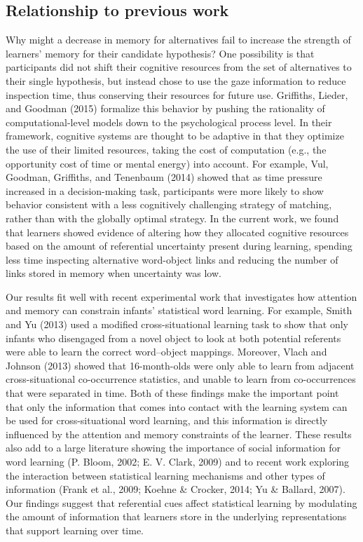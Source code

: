 \documentclass[oneside]{report}
\begin{document}
\subsection{Relationship to previous
work}\label{relationship-to-previous-work}

Why might a decrease in memory for alternatives fail to increase the
strength of learners' memory for their candidate hypothesis? One
possibility is that participants did not shift their cognitive resources
from the set of alternatives to their single hypothesis, but instead
chose to use the gaze information to reduce inspection time, thus
conserving their resources for future use. Griffiths, Lieder, and
Goodman (2015) formalize this behavior by pushing the rationality of
computational-level models down to the psychological process level. In
their framework, cognitive systems are thought to be adaptive in that
they optimize the use of their limited resources, taking the cost of
computation (e.g., the opportunity cost of time or mental energy) into
account. For example, Vul, Goodman, Griffiths, and Tenenbaum (2014)
showed that as time pressure increased in a decision-making task,
participants were more likely to show behavior consistent with a less
cognitively challenging strategy of matching, rather than with the
globally optimal strategy. In the current work, we found that learners
showed evidence of altering how they allocated cognitive resources based
on the amount of referential uncertainty present during learning,
spending less time inspecting alternative word-object links and reducing
the number of links stored in memory when uncertainty was low.

Our results fit well with recent experimental work that investigates how
attention and memory can constrain infants' statistical word learning.
For example, Smith and Yu (2013) used a modified cross-situational
learning task to show that only infants who disengaged from a novel
object to look at both potential referents were able to learn the
correct word--object mappings. Moreover, Vlach and Johnson (2013) showed
that 16-month-olds were only able to learn from adjacent
cross-situational co-occurrence statistics, and unable to learn from
co-occurrences that were separated in time. Both of these findings make
the important point that only the information that comes into contact
with the learning system can be used for cross-situational word
learning, and this information is directly influenced by the attention
and memory constraints of the learner. These results also add to a large
literature showing the importance of social information for word
learning (P. Bloom, 2002; E. V. Clark, 2009) and to recent work
exploring the interaction between statistical learning mechanisms and
other types of information (Frank et al., 2009; Koehne \& Crocker, 2014;
Yu \& Ballard, 2007). Our findings suggest that referential cues affect
statistical learning by modulating the amount of information that
learners store in the underlying representations that support learning
over time.
\end{document}

